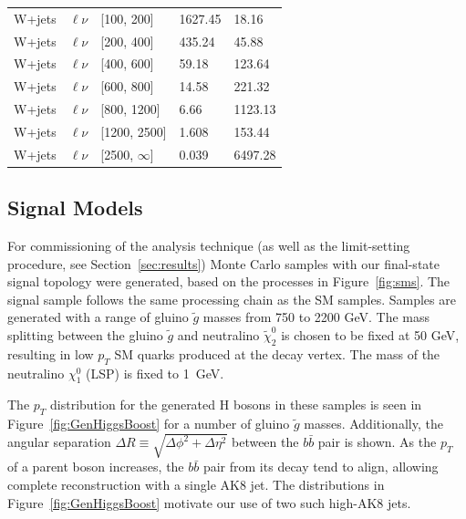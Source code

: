 \begin{table}
\begin{tabular}{cclll}
W+jets & $\ell\nu$ & [100, 200] & 1627.45 & 18.16\\
W+jets & $\ell{\nu}$ & [200, 400] & 435.24 & 45.88\\
W+jets & $\ell{\nu}$ & [400, 600] & 59.18 & 123.64\\
W+jets & $\ell{\nu}$ & [600, 800] & 14.58 & 221.32\\
W+jets & $\ell{\nu}$ & [800, 1200] & 6.66 & 1123.13\\
W+jets & $\ell{\nu}$ & [1200, 2500] & 1.608 & 153.44\\
W+jets & $\ell{\nu}$ & [2500, $\infty$] & 0.039 & 6497.28\\
\hline \hline
\end{tabular}
\end{table}

\subsection{Signal Models}
\label{sec:signal-models}

For commissioning of the analysis technique (as well as the limit-setting procedure, see Section~\ref{sec:results}) Monte Carlo samples with our final-state signal topology were generated, based on the processes in Figure~\ref{fig:sms}. The signal sample follows the same processing chain as the SM samples. Samples are generated with a range of gluino $\tilde{g}$ masses from 750 to 2200 GeV. The mass splitting between the gluino $\tilde{g}$ and neutralino $\tilde{\chi}_{2}^{0}$ is chosen to be fixed at 50 GeV, resulting in low $p_{T}$ SM quarks produced at the decay vertex. The mass of the neutralino $\chi^{0}_{1}$ (LSP) is fixed to 1~GeV.

The $p_{T}$ distribution for the generated H bosons in these samples is seen in Figure~\ref{fig:GenHiggsBoost} for a number of gluino $\tilde{g}$ masses. Additionally, the angular separation $\Delta R \equiv \sqrt{\Delta\phi^{2}+\Delta\eta^{2}}$ between the $b\bar{b}$ pair is shown. As the $p_{T}$ of a parent boson increases, the $b\bar{b}$ pair from its decay tend to align, allowing complete reconstruction with a single AK8 jet. The distributions in Figure~\ref{fig:GenHiggsBoost} motivate our use of two such high-\pt AK8 jets.

